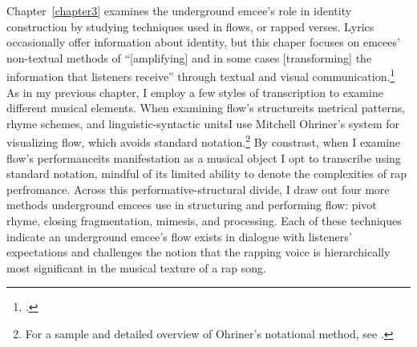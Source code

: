 Chapter~\ref{chapter3} examines the underground emcee's role in identity construction by studying 
techniques used in flows, or rapped verses. Lyrics occasionally offer information about identity,
but this chaper focuses on emcees' non-textual methods of ``[amplifying] and in some cases [transforming]
the information that listeners receive'' through textual and visual communication.\footnote{
    \autocite[12]{lorenkajikawaSoundingRaceRap2015}.} 
As in my previous chapter, I employ a few styles of transcription to examine different musical
elements. When examining flow's structure\textemdash its metrical patterns, rhyme schemes, and 
linguistic-syntactic units\textemdash I use Mitchell Ohriner's system for visualizing flow, which
avoids standard notation.\footnote{
    For a sample and detailed overview of Ohriner's notational method, see 
    \autocite[xxvii--xl]{mitchellohrinerFlowRhythmicVoice2019}.}
By constrast, when I examine flow's performance\textemdash its manifestation as a musical object\textemdash
I opt to transcribe using standard notation, mindful of its limited ability to denote the complexities
of rap perfromance. Across this performative-structural divide, I draw out four more methods underground
emcees use in structuring and performing flow: pivot rhyme, closing fragmentation, mimesis, and processing.
Each of these techniques indicate an underground emcee's flow exists in dialogue with listeners' expectations 
and challenges the notion that the rapping voice is hierarchically most significant in the musical texture
of a rap song.